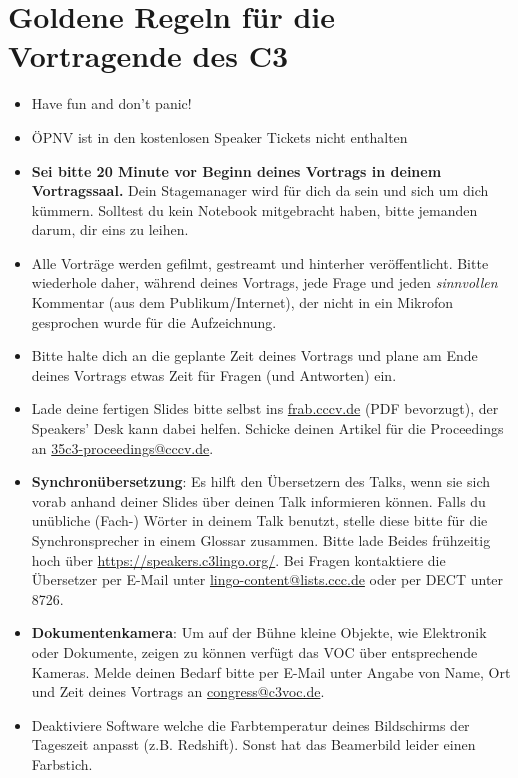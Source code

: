 \documentclass[paper=a4]{scrartcl}
\begin{document}
\section*{Goldene Regeln für die Vortragende des C3}
\begin{itemize}
	\item Have fun and don't panic!
	\item ÖPNV ist in den kostenlosen Speaker Tickets nicht enthalten
	\item \textbf{Sei bitte 20 Minute vor Beginn deines Vortrags in deinem Vortragssaal.} Dein Stagemanager wird für dich da sein und sich um dich kümmern. Solltest du kein Notebook mitgebracht haben, bitte jemanden darum, dir eins zu leihen.
	\item Alle Vorträge werden gefilmt, gestreamt und hinterher veröffentlicht. Bitte wiederhole daher, während deines Vortrags, jede Frage und jeden \textit{sinnvollen} Kommentar (aus dem Publikum/Internet), der nicht in ein Mikrofon gesprochen wurde für die Aufzeichnung.
	\item Bitte halte dich an die geplante Zeit deines Vortrags und plane am Ende deines Vortrags etwas Zeit für Fragen (und Antworten) ein.
	\item Lade deine fertigen Slides bitte selbst ins \url{frab.cccv.de} (PDF bevorzugt), der Speakers' Desk kann dabei helfen. Schicke deinen Artikel für die Proceedings an \url{35c3-proceedings@cccv.de}.
	\item \textbf{Synchronübersetzung}: Es hilft den Übersetzern des Talks, wenn sie sich vorab anhand deiner Slides über deinen Talk informieren können. Falls du unübliche (Fach-\nobreak) Wörter in deinem Talk benutzt, stelle diese bitte für die Synchronsprecher in einem Glossar zusammen. Bitte lade Beides frühzeitig hoch über \url{https://speakers.c3lingo.org/}. Bei Fragen kontaktiere die Übersetzer per E-Mail unter \url{lingo-content@lists.ccc.de} oder per DECT unter 8726.
	\item \textbf{Dokumentenkamera}: Um auf der Bühne kleine Objekte, wie Elektronik oder Dokumente, zeigen zu können verfügt das VOC über entsprechende Kameras. Melde deinen Bedarf bitte per E-Mail unter Angabe von Name, Ort und Zeit deines Vortrags an \url{congress@c3voc.de}.
	\item Deaktiviere Software welche die Farbtemperatur deines Bildschirms der Tageszeit anpasst (z.B. Redshift). Sonst hat das Beamerbild leider einen Farbstich.
\end{itemize}
\end{document}
